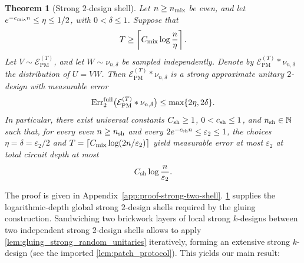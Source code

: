 \documentclass[
    aps,
    superscriptaddress,
    onecolumn,
    10pt,
    prx,
    nofootinbib
]{revtex4-2}
\newtheorem{theorem}{Theorem}
\newcommand{\PM}{\mathrm{PM}}
\newcommand{\cE}{\mathcal E}
\theoremstyle{namedstatement}
\theoremstyle{plain}
\begin{document}
\begin{theorem}[Strong $2$-design shell]
\label{thm:shell}
Let $n\geq n_{\rm mix}$ be even, and let
$e^{-c_{\rm mix}n}\leq\eta\leq1/2$, with $0 <\delta\leq1$. Suppose that
\begin{equation}
    T
    \geq
    \left\lceil
        C_{\rm mix}\log\frac{n}{\eta}
    \right\rceil.
    \label{eq:shell-depth-condition}
\end{equation}
Let $V\sim\cE_{\PM}^{(T)}$, and let $W\sim\nu_{n,\delta}$ be sampled independently. Denote by $\cE_{\PM}^{(T)}*\nu_{n,\delta}$ the distribution of $U=VW$. Then $\cE_{\PM}^{(T)}*\nu_{n,\delta}$ is a strong approximate unitary $2$-design with measurable error
\begin{equation}
    \operatorname{Err}_{2}^{\rm full}
    \bigl(
        \cE_{\PM}^{(T)}*\nu_{n,\delta}
    \bigr)
    \leq
    \max\{2\eta,2\delta\}.
    \label{eq:shell-error}
\end{equation}
In particular, there exist universal constants $C_{\rm sh}\geq1$,
$0<c_{\rm sh}\leq1$, and $n_{\rm sh}\in\mathbb N$ such that, for
every even $n\geq n_{\rm sh}$ and every
$2e^{-c_{\rm sh}n}\leq\varepsilon_{2}\leq1$, the choices
$\eta=\delta=\varepsilon_{2}/2$ and
$T=\lceil C_{\rm mix}\log(2n/\varepsilon_{2})\rceil$ yield
measurable error at most $\varepsilon_{2}$ at total circuit depth
at most
\begin{equation}
    C_{\rm sh}\log\frac{n}{\varepsilon_{2}}.
    \label{eq:shell-total-depth}
\end{equation}
\end{theorem}

The proof is given in Appendix~\ref{app:proof-strong-two-shell}. \cref{thm:shell} supplies the logarithmic-depth global strong $2$-design shells required by the gluing construction. Sandwiching two brickwork layers of local strong $k$-designs between two independent strong 2-design shells allows to apply \cref{lem:gluing_strong_random_unitaries} iteratively, forming an extensive strong $k$-design (see the imported \cref{lem:patch_protocol}). This yields our main result:
\end{document}
